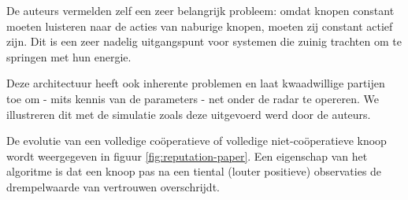 De auteurs vermelden zelf een zeer belangrijk probleem: omdat knopen constant
moeten luisteren naar de acties van naburige knopen, moeten zij constant actief
zijn. Dit is een zeer nadelig uitgangspunt voor systemen die zuinig trachten om
te springen met hun energie.

Deze architectuur heeft ook inherente problemen en laat kwaadwillige partijen
toe om - mits kennis van de parameters - net onder de radar te opereren. We
illustreren dit met de simulatie zoals deze uitgevoerd werd door de auteurs.

De evolutie van een volledige co\"operatieve of volledige niet-co\"operatieve
knoop wordt weergegeven in figuur \ref{fig:reputation-paper}. Een eigenschap
van het algoritme is dat een knoop pas na een tiental (louter positieve)
observaties de drempelwaarde van vertrouwen overschrijdt.

